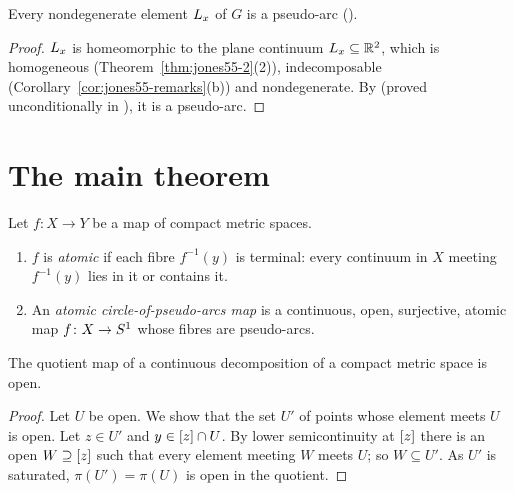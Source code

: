 \begin{proposition}\label{prop:elements-pseudoarc}
Every nondegenerate element $L_{x}$ of $G$ is a pseudo-arc ().
\end{proposition}

\begin{proof}
$L_{x}$ is homeomorphic to the plane continuum $L_{x}\subseteq\mathbb{R}^2$, which is homogeneous (Theorem~\ref{thm:jones55-2}(2)), indecomposable
(Corollary~\ref{cor:jones55-remarks}(b)) and nondegenerate. By  (proved unconditionally in ), it is a pseudo-arc.
\end{proof}


\section{The main theorem}

\begin{definition}\label{def:atomic}
Let $f\colon X\to Y$ be a map of compact metric spaces.
\begin{enumerate}[label=(\alph*)]
\item $f$ is \emph{atomic} if each fibre $f^{-1}(y)$ is terminal: every continuum in $X$ meeting $f^{-1}(y)$ lies in it or contains it.
\item An \emph{atomic circle-of-pseudo-arcs map} is a continuous, open, surjective, atomic map $f\colon X\to S^1$ whose fibres are pseudo-arcs.
\end{enumerate}
\end{definition}


\begin{lemma}\label{lem:open-quotient}
The quotient map of a continuous decomposition of a compact metric space is open.
\end{lemma}

\begin{proof}
Let $U$ be open. We show that the set $U'$ of points whose element meets $U$ is open. Let $z\in U'$ and $y\in[z]\cap U$. By lower semicontinuity at $[z]$
there is an open $W\supseteq[z]$ such that every element meeting $W$ meets $U$; so $W\subseteq U'$. As $U'$ is saturated, $\pi(U')=\pi(U)$ is open in the quotient.
\end{proof}

